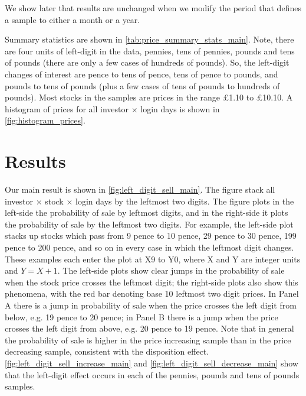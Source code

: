 We show later that results are unchanged when we modify the period that defines a sample to either a month or a year. 

Summary statistics are shown in \ref{tab:price_summary_stats_main}. Note, there are four units of left-digit in the data, pennies, tens of pennies, pounds and tens of pounds (there are only a few cases of hundreds of pounds). So, the left-digit changes of interest are pence to tens of pence, tens of pence to pounds, and pounds to tens of pounds (plus a few cases of tens of pounds to hundreds of pounds). Most stocks in the samples are prices in the range \pounds1.10 to \pounds10.10. A histogram of prices for all investor $\times$ login days is shown in \ref{fig:histogram_prices}.

\section{Results}

Our main result is shown in \ref{fig:left_digit_sell_main}. The figure stack all investor $\times$ stock $\times$ login days by the leftmost two digits. The figure plots in the left-side the probability of sale by leftmost digits, and in the right-side it plots the probability of sale by the leftmost two digits. For example, the left-side plot stacks up stocks which pass from 9 pence to 10 pence, 29 pence to 30 pence, 199 pence to 200 pence, and so on in every case in which the leftmost digit changes. These examples each enter the plot at X9 to Y0, where X and Y are integer units and $Y = X + 1$. The left-side plots show clear jumps in the probability of sale when the stock price crosses the leftmost digit; the right-side plots also show this phenomena, with the red bar denoting base 10 leftmost two digit prices. In Panel A there is a jump in probability of sale when the price crosses the left digit from below, e.g. 19 pence to 20 pence; in Panel B there is a jump when the price crosses the left digit from above, e.g. 20 pence to 19 pence. Note that in general the probability of sale is higher in the price increasing sample than in the price decreasing sample, consistent with the disposition effect. \ref{fig:left_digit_sell_increase_main} and \ref{fig:left_digit_sell_decrease_main} show that the left-digit effect occurs in each of the pennies, pounds and tens of pounds samples.

